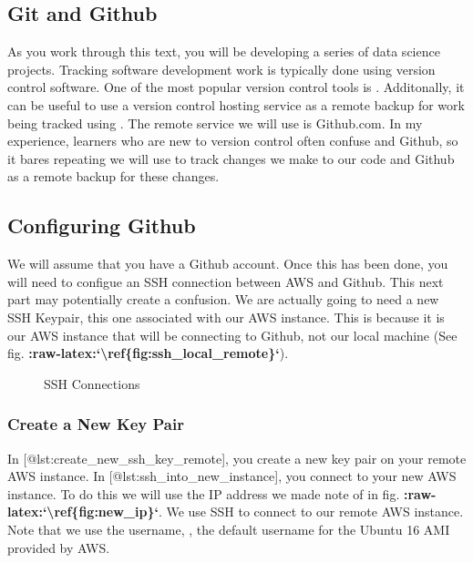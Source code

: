 \documentclass[letterpaper,10pt,english]{sphinxmanual}
\begin{document}
\begin{figure}[htbp]
\centering

\noindent{}
\end{figure}


\subsection{Git and Github}
\label{\detokenize{02-elastic-compute-cloud:Git-and-Github}}
As you work through this text, you will be developing a series of data
science projects. Tracking software development work is typically done
using version control software. One of the most popular version control
tools is . Additonally, it can be useful to use a version control
hosting service as a remote backup for work being tracked using .
The remote service we will use is Github.com. In my experience, learners
who are new to version control often confuse  and Github, so it
bares repeating \textendash{} we will use  to track changes we make to our
code and Github as a remote backup for these changes.


\subsection{Configuring Github}
\label{\detokenize{02-elastic-compute-cloud:Configuring-Github}}
We will assume that you have a Github account. Once this has been done,
you will need to configue an SSH connection between AWS and Github. This
next part may potentially create a confusion. We are actually going to
need a new SSH Keypair, this one associated with our AWS instance. This
is because it is our AWS instance that will be connecting to Github, not
our local machine (See fig. {\color{red}\bfseries{}:raw-latex:{}`\textbackslash{}ref\{fig:ssh\_local\_remote\}{}`}).

\begin{figure}[htbp]
\centering
\capstart

\noindent{}
\caption{SSH Connections}\label{\detokenize{02-elastic-compute-cloud:id39}}\end{figure}


\subsubsection{Create a New Key Pair}
\label{\detokenize{02-elastic-compute-cloud:Create-a-New-Key-Pair}}
In {[}@lst:create\_new\_ssh\_key\_remote{]}, you create a new key pair on
your remote AWS instance. In {[}@lst:ssh\_into\_new\_instance{]}, you
connect to your new AWS instance. To do this we will use the IP address
we made note of in fig. {\color{red}\bfseries{}:raw-latex:{}`\textbackslash{}ref\{fig:new\_ip\}{}`}. We use SSH to
connect to our remote AWS instance. Note that we use the username,
, the default username for the Ubuntu 16 AMI provided by AWS.
\end{document}
